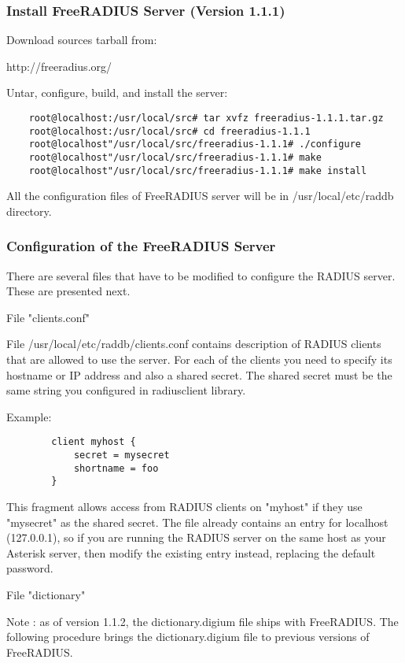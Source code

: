 \subsubsection{Install FreeRADIUS Server (Version 1.1.1)}
 
	Download sources tarball from:

		http://freeradius.org/
			
	Untar, configure, build, and install the server:

\begin{verbatim}
	root@localhost:/usr/local/src# tar xvfz freeradius-1.1.1.tar.gz
	root@localhost:/usr/local/src# cd freeradius-1.1.1
	root@localhost"/usr/local/src/freeradius-1.1.1# ./configure
	root@localhost"/usr/local/src/freeradius-1.1.1# make
	root@localhost"/usr/local/src/freeradius-1.1.1# make install
\end{verbatim}

	All the configuration files of FreeRADIUS server will be in 
	/usr/local/etc/raddb directory. 
		

\subsubsection{Configuration of the FreeRADIUS Server}
			
	There are several files that have to be modified to configure the
	RADIUS server. These are presented next.

	File "clients.conf"
			
	File /usr/local/etc/raddb/clients.conf contains description of 
	RADIUS clients that are allowed to use the server. For each of the 
	clients you need to specify its hostname or IP address and also a 
	shared secret. The shared secret must be the same string you configured
	in radiusclient library.

	Example:
\begin{verbatim}
		client myhost {
		    secret = mysecret
		    shortname = foo
		}
\end{verbatim}	

	This fragment allows access from RADIUS clients on "myhost" if they use 
	"mysecret" as the shared secret.	 
	The file already contains an entry for localhost (127.0.0.1), so if you
	are running the RADIUS server on the same host as your Asterisk server,
	then modify the existing entry instead, replacing the default password.
		
	File "dictionary"
		
	Note : as of version 1.1.2, the dictionary.digium file ships with FreeRADIUS. 
	The following procedure brings the dictionary.digium file to previous versions 
	of FreeRADIUS.
	
